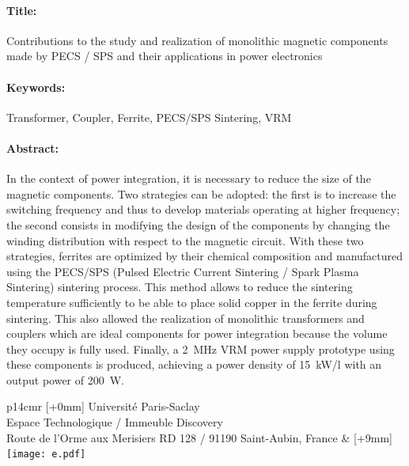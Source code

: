 \documentclass[12pt,a4paper]{book}
\begin{document}
\begin{mdframed}[linecolor=Prune,linewidth=1]
\vspace{-.25cm}
\paragraph*{Title:} Contributions to the study and realization of monolithic magnetic components made by PECS / SPS and their applications in power electronics

\begin{small}
\vspace{-.25cm}
\paragraph*{Keywords:} Transformer, Coupler, Ferrite, PECS/SPS Sintering, VRM

\vspace{-.5cm}
\begin{multicols}{2}
\paragraph*{Abstract:} In the context of power integration, it is necessary to reduce the size of the magnetic components. Two strategies can be adopted: the first is to increase the switching frequency and thus to develop materials operating at higher frequency; the second consists in modifying the design of the components by changing the winding distribution with respect to the magnetic circuit. With these two strategies, ferrites are optimized by their chemical composition and manufactured using the PECS/SPS (Pulsed Electric Current Sintering / Spark Plasma Sintering) sintering process. This method allows to reduce the sintering temperature sufficiently to be able to place solid copper in the ferrite during sintering. This also allowed the realization of monolithic transformers and couplers which are ideal components for power integration because the volume they occupy is fully used. Finally, a 2~MHz VRM power supply prototype using these components is produced, achieving a power density of 15~kW/l with an output power of 200~W.
\end{multicols}
\end{small}
\end{mdframed}

\vspace{3cm} %
\selectfont
\begin{tabular}{p{14cm}r}
[+0mm]{{\color{Prune} Université Paris-Saclay\\
Espace Technologique / Immeuble Discovery\\
Route de l’Orme aux Merisiers RD 128 / 91190 Saint-Aubin, France}} & [+9mm]{\texttt{[image: e.pdf]}}\\
\end{tabular}
\end{document}
